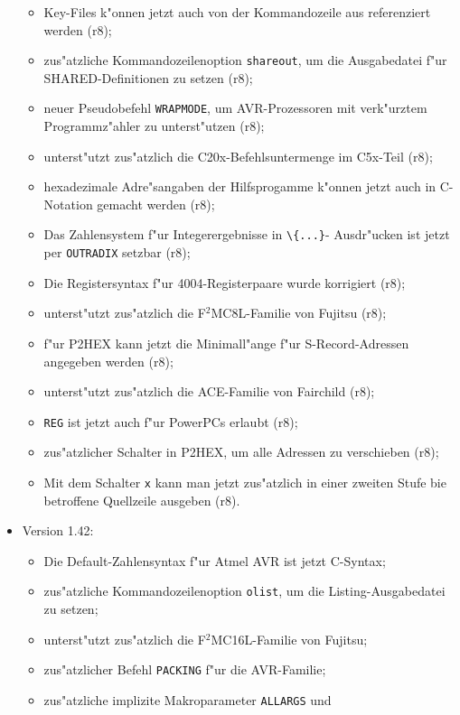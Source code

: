 \documentclass[12pt,a4paper,twoside]{report}
\newcommand{\tty}[1]{{\tt #1}}
\begin{document}
\begin{itemize}
{\begin{itemize}
      \item{Key-Files k"onnen jetzt auch von der Kommandozeile aus
            referenziert werden (r8);}
      \item{zus"atzliche Kommandozeilenoption {\tt shareout}, um die
            Ausgabedatei f"ur SHARED-Definitionen zu setzen (r8);}
      \item{neuer Pseudobefehl {\tt WRAPMODE}, um AVR-Prozessoren mit
            verk"urztem Programmz"ahler zu unterst"utzen (r8);}
      \item{unterst"utzt zus"atzlich die C20x-Befehlsuntermenge im
            C5x-Teil (r8);}
      \item{hexadezimale Adre"sangaben der Hilfsprogamme k"onnen jetzt
            auch in C-Notation gemacht werden (r8);}
      \item{Das Zahlensystem f"ur Integerergebnisse in \verb!\{...}!-
            Ausdr"ucken ist jetzt per \tty{OUTRADIX} setzbar (r8);}
      \item{Die Registersyntax f"ur 4004-Registerpaare wurde korrigiert
            (r8);}
      \item{unterst"utzt zus"atzlich die F$^{2}$MC8L-Familie von Fujitsu
            (r8);}
      \item{f"ur P2HEX kann jetzt die Minimall"ange f"ur S-Record-Adressen
            angegeben werden (r8);}
      \item{unterst"utzt zus"atzlich die ACE-Familie von Fairchild (r8);}
      \item{{\tt REG} ist jetzt auch f"ur PowerPCs erlaubt (r8);}
      \item{zus"atzlicher Schalter in P2HEX, um alle Adressen zu
            verschieben (r8);}
      \item{Mit dem Schalter \tty{x} kann man jetzt zus"atzlich in einer
            zweiten Stufe bie betroffene Quellzeile ausgeben (r8).}
      \end{itemize}}
\item{Version 1.42:
      \begin{itemize}
      \item{Die Default-Zahlensyntax f"ur Atmel AVR ist jetzt C-Syntax;}
      \item{zus"atzliche Kommandozeilenoption {\tt olist}, um die
            Listing-Ausgabedatei zu setzen;}
      \item{unterst"utzt zus"atzlich die F$^{2}$MC16L-Familie von Fujitsu;}
      \item{zus"atzlicher Befehl {\tt PACKING} f"ur die AVR-Familie;}
      \item{zus"atzliche implizite Makroparameter {\tt ALLARGS} und
}
\end{itemize}}
\end{itemize}
\end{document}
